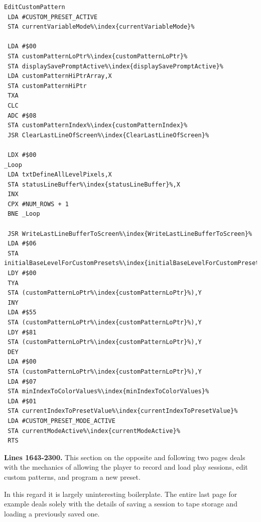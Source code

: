 \begin{minipage}[b]{0.33\linewidth}
\begin{lrbox}{\mybox}
\begin{lstlisting}[basicstyle=\ttfamily\tiny,escapechar=\%]
EditCustomPattern
 LDA #CUSTOM_PRESET_ACTIVE
 STA currentVariableMode%\index{currentVariableMode}%

 LDA #$00
 STA customPatternLoPtr%\index{customPatternLoPtr}%
 STA displaySavePromptActive%\index{displaySavePromptActive}%
 LDA customPatternHiPtrArray,X
 STA customPatternHiPtr
 TXA
 CLC
 ADC #$08
 STA customPatternIndex%\index{customPatternIndex}%
 JSR ClearLastLineOfScreen%\index{ClearLastLineOfScreen}%

 LDX #$00
_Loop   
 LDA txtDefineAllLevelPixels,X
 STA statusLineBuffer%\index{statusLineBuffer}%,X
 INX
 CPX #NUM_ROWS + 1
 BNE _Loop

 JSR WriteLastLineBufferToScreen%\index{WriteLastLineBufferToScreen}%
 LDA #$06
 STA initialBaseLevelForCustomPresets%\index{initialBaseLevelForCustomPresets}%
 LDY #$00
 TYA
 STA (customPatternLoPtr%\index{customPatternLoPtr}%),Y
 INY
 LDA #$55
 STA (customPatternLoPtr%\index{customPatternLoPtr}%),Y
 LDY #$81
 STA (customPatternLoPtr%\index{customPatternLoPtr}%),Y
 DEY
 LDA #$00
 STA (customPatternLoPtr%\index{customPatternLoPtr}%),Y
 LDA #$07
 STA minIndexToColorValues%\index{minIndexToColorValues}%
 LDA #$01
 STA currentIndexToPresetValue%\index{currentIndexToPresetValue}%
 LDA #CUSTOM_PRESET_MODE_ACTIVE
 STA currentModeActive%\index{currentModeActive}%
 RTS
\end{lstlisting}
\end{lrbox}%
\scalebox{0.8}{\usebox{\mybox}}
\end{minipage}
\clearpage
{}
\textbf{Lines 1643-2300.} This section on the opposite and following two pages deals with the mechanics of 
allowing the player to record and load play sessions, edit custom patterns, and program a new preset. 

In this regard it is largely uninteresting boilerplate. The entire last page for example deals solely with the
details of saving a session to tape storage and loading a previously saved one.

